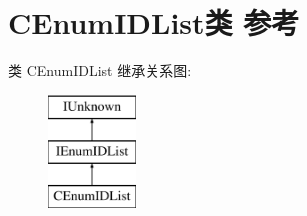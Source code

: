 \hypertarget{class_c_enum_i_d_list}{}\section{C\+Enum\+I\+D\+List类 参考}
\label{class_c_enum_i_d_list}
类 C\+Enum\+I\+D\+List 继承关系图\+:\begin{figure}[H]
\begin{center}
\leavevmode
\includegraphics[height=3.000000cm]{class_c_enum_i_d_list}
\end{center}
\end{figure}
